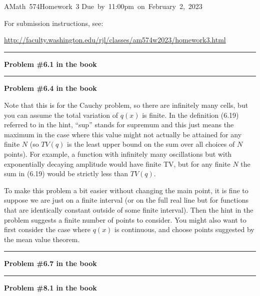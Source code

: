 \documentclass[11pt]{article}
\begin{document}
\hfill\vbox{\hbox{AMath 574}\hbox{Homework 3}
\hbox{Due by 11:00pm on February 2, 2023}}

For submission instructions, see:

\url{http://faculty.washington.edu/rjl/classes/am574w2023/homework3.html}

\vskip 1cm
\hrule
{\bf Problem \#6.1 in the book}




\vskip 1cm
\hrule
{\bf Problem \#6.4 in the book} 

Note that this is for the Cauchy problem, so there are infinitely many cells, but you can assume the total variation of $q(x)$ is finite.  In the definition (6.19) referred to in the hint, ``sup'' stands for supremum and this just means the maximum in the case where this value might not actually be attained for any finite $N$ (so $TV(q)$ is the least upper bound on the sum over all choices of $N$ points).  For example, a function with infinitely many oscillations but with exponentially decaying amplitude would have finite TV,  but for any finite $N$ the sum in (6.19) would be strictly less than $TV(q)$.

To make this problem a bit easier without changing the main point, it is fine to suppose we are just on a finite interval (or on the full real line but for functions that are identically constant outside of some finite interval).  Then the hint in the problem suggests a finite number of points to consider.  You might also want to first consider the case where $q(x)$ is continuous, and choose points suggested by the mean value theorem.





\vskip 1cm
\hrule
{\bf Problem \#6.7 in the book}




\vskip 1cm
\hrule
{\bf Problem \#8.1 in the book}
\end{document}
